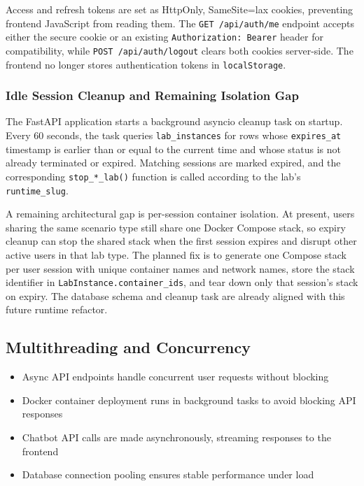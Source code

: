 \documentclass[12pt,a4paper]{report}
\begin{document}
Access and refresh tokens are set as HttpOnly, SameSite=lax cookies, preventing frontend JavaScript from reading them. The \texttt{GET /api/auth/me} endpoint accepts either the secure cookie or an existing \texttt{Authorization: Bearer} header for compatibility, while \texttt{POST /api/auth/logout} clears both cookies server-side. The frontend no longer stores authentication tokens in \texttt{localStorage}.

\subsubsection{Idle Session Cleanup and Remaining Isolation Gap}

The FastAPI application starts a background asyncio cleanup task on startup. Every 60 seconds, the task queries \texttt{lab\_instances} for rows whose \texttt{expires\_at} timestamp is earlier than or equal to the current time and whose status is not already terminated or expired. Matching sessions are marked expired, and the corresponding \texttt{stop\_*\_lab()} function is called according to the lab's \texttt{runtime\_slug}.

A remaining architectural gap is per-session container isolation. At present, users sharing the same scenario type still share one Docker Compose stack, so expiry cleanup can stop the shared stack when the first session expires and disrupt other active users in that lab type. The planned fix is to generate one Compose stack per user session with unique container names and network names, store the stack identifier in \texttt{LabInstance.container\_ids}, and tear down only that session's stack on expiry. The database schema and cleanup task are already aligned with this future runtime refactor.

\subsection{Multithreading and Concurrency}
\begin{itemize}
  \item Async API endpoints handle concurrent user requests without blocking
  \item Docker container deployment runs in background tasks to avoid blocking API responses
  \item Chatbot API calls are made asynchronously, streaming responses to the frontend
  \item Database connection pooling ensures stable performance under load
\end{itemize}
\end{document}
